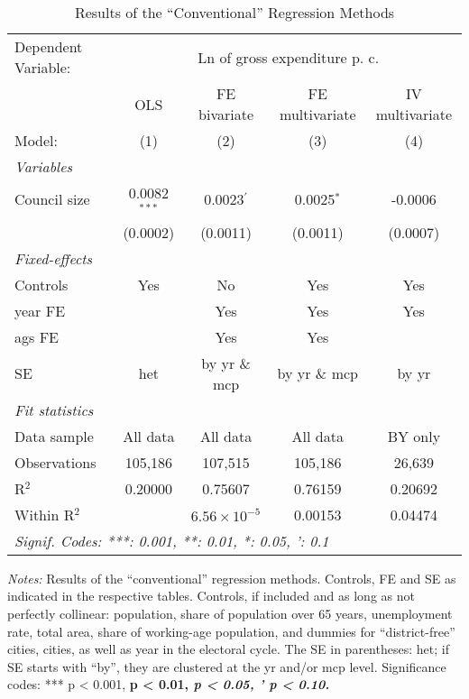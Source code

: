 
\begin{table}[htbp]
   \caption{\label{tab:conv_results} Results of the ``Conventional'' Regression Methods}
   \centering
   \begin{tabular}{lcccc}
      \tabularnewline \midrule \midrule
      Dependent Variable: & \multicolumn{4}{c}{Ln of gross expenditure p. c.}\\
                    & \acs{OLS}      & \acs{FE} bivariate    & \acs{FE} multivariate  & \acs{IV} multivariate \\    
      Model:        & (1)            & (2)                   & (3)                    & (4)\\  
      \midrule
      \emph{Variables}\\
      Council size  & 0.0082$^{***}$ & 0.0023$^{'}$          & 0.0025$^{*}$           & -0.0006\\   
                    & (0.0002)       & (0.0011)              & (0.0011)               & (0.0007)\\   
      \midrule
      \emph{Fixed-effects}\\
      Controls      & Yes            & No                    & Yes                    & Yes\\  
      year \ac{FE}  &                & Yes                   & Yes                    & Yes\\  
      ags \ac{FE}   &                & Yes                   & Yes                    & \\  
      \acs{SE} & \acs{het} & by \acs{yr} \& \acs{mcp} & by \acs{yr} \& \acs{mcp} & by \acs{yr}\\
      \midrule
      \emph{Fit statistics}\\
      Data sample   & All data       & All data              & All data               & \acs{BY} only\\   
      Observations  & 105,186        & 107,515               & 105,186                & 26,639\\  
      R$^2$         & 0.20000        & 0.75607               & 0.76159                & 0.20692\\  
      Within R$^2$  &                & $6.56\times 10^{-5}$  & 0.00153                & 0.04474\\  
      \midrule \midrule
      \multicolumn{5}{l}{\emph{Signif. Codes: ***: 0.001, **: 0.01, *: 0.05, ': 0.1}}\\
   \end{tabular}
   
   \par \raggedright 
   \footnotesize{\textit{Notes:} Results of the ``conventional'' regression methods. Controls, \ac{FE} and \ac{SE} as indicated in the respective tables. Controls, if included and as long as not perfectly collinear: population, share of population over 65 years, unemployment rate, total area, share of working-age population, and dummies for ``district-free'' cities, cities, as well as year in the electoral cycle. The \acl{SE} in parentheses: \ac{het}; if \ac{SE} starts with ``by'', they are clustered at the \ac{yr} and/or \ac{mcp} level. Significance codes: *** p < 0.001, \textbf{ p < 0.01, \textit{ p < 0.05, ' p < 0.10.}}}
\end{table}


